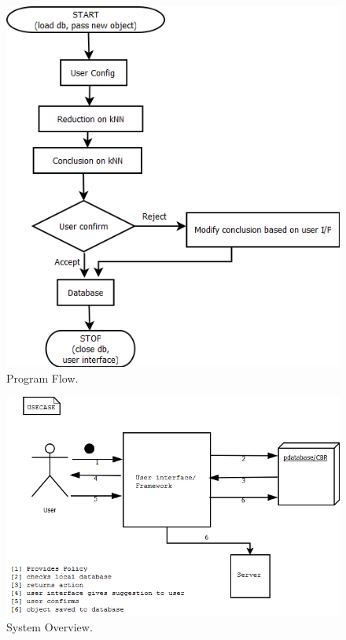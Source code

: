 \begin{figure}[htbp]
\begin{center}
\includegraphics[width = \textwidth]{DesignReport/uml/flowchart.png}
\caption{Program Flow.}
\label{DesignFlowChart}
\end{center}
\end{figure}


\begin{figure}[htbp]
\begin{center}
\includegraphics[width = \textwidth]{DesignReport/uml/Case.png}
\caption{System Overview.}
\label{SystemOverview}
\end{center}
\end{figure}

